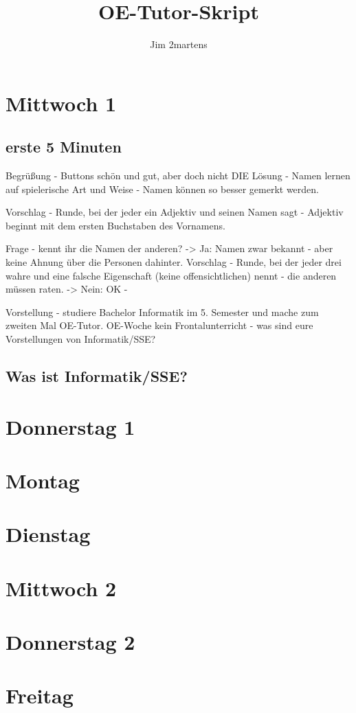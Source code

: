 \documentclass[10pt,a4paper,oneside,ngerman,numbers=noenddot]{scrartcl}
\begin{document}
\author{Jim 2martens}
\title{OE-Tutor-Skript}
\maketitle

\tableofcontents

\section{Mittwoch 1}

	\subsection{erste 5 Minuten}
	Begrüßung - Buttons schön und gut, aber doch nicht DIE Lösung - Namen lernen auf spielerische Art und Weise - Namen können so besser gemerkt werden.
	
	Vorschlag - Runde,  bei der jeder ein Adjektiv und seinen Namen sagt - Adjektiv beginnt mit dem ersten Buchstaben des Vornamens.
	
	Frage - kennt ihr die Namen der anderen? 
	-> Ja: Namen zwar bekannt - aber keine Ahnung über die Personen dahinter. Vorschlag - Runde, bei der jeder drei wahre und eine falsche Eigenschaft (keine offensichtlichen) nennt - die anderen müssen raten.
	-> Nein: OK - %
	
	Vorstellung - studiere Bachelor Informatik im 5. Semester und mache zum zweiten Mal OE-Tutor. OE-Woche kein Frontalunterricht - was sind eure Vorstellungen von Informatik/SSE?
	
	\subsection{Was ist Informatik/SSE?}
	
	

\section{Donnerstag 1}

\section{Montag}

\section{Dienstag}

\section{Mittwoch 2}

\section{Donnerstag 2}

\section{Freitag}
\end{document}
